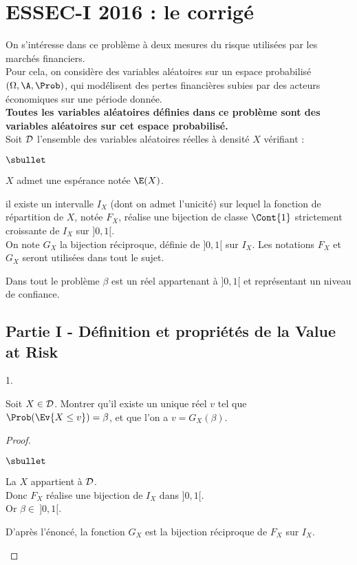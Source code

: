 \chapter*{ESSEC-I 2016 : le corrigé}
  
%

\noindent
On s'intéresse dans ce problème à deux mesures du risque utilisées 
par les marchés financiers.\\
Pour cela, on considère des variables aléatoires sur un espace 
probabilisé $(\Omega,\A,\Prob)$, qui modélisent des pertes 
financières subies par des acteurs économiques sur une période donnée.\\
{\bf Toutes les variables aléatoires définies dans ce problème 
sont des variables aléatoires sur cet espace probabilisé.}\\
Soit ${\cal D}$ l'ensemble des variables aléatoires réelles à 
densité $X$ vérifiant :
\begin{noliste}{$\sbullet$}
  \item $X$ admet une espérance notée $\E(X)$.
  \item il existe un intervalle $I_X$ (dont on admet 
  l'unicité) sur lequel la fonction de répartition de $X$, notée 
  $F_X$, réalise une bijection de classe $\Cont{1}$ strictement 
  croissante de $I_X$ sur $]0,1[$.\\
  On note $G_X$ la bijection réciproque, définie de $]0,1[$ sur 
  $I_X$. Les notations $F_X$ et $G_X$ seront utilisées dans tout 
  le sujet.
\end{noliste}
Dans tout le problème $\beta$ est un réel appartenant à $]0,1[$ et 
représentant un niveau de confiance.

\section*{Partie I - Définition et propriétés de la \og Value at 
Risk \fg}

\begin{noliste}{1.}
  \setlength{\itemsep}{4mm}
  \item Soit $X \in {\cal D}$. Montrer qu'il existe un unique réel 
  $v$ tel que $\Prob(\Ev{X \leq v})=\beta$, et que l'on a 
  $v=G_X(\beta)$.
  
  \begin{proof}~
    \begin{noliste}{$\sbullet$}
      \item La \var $X$ appartient à ${\cal D}$.\\
      Donc $F_X$ réalise une bijection de $I_X$ dans $]0,1[$.\\
      Or $\beta \in \ ]0,1[$.
      
      \item D'après l'énoncé, la fonction $G_X$ est la
      bijection réciproque de $F_X$ sur $I_X$.
      ~\\[-1.4cm]
    \end{noliste}
  \end{proof}

\end{noliste}

